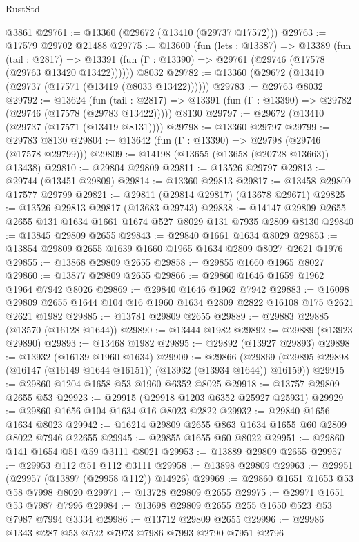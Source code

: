 \begin{lexlean}{RustStd}
\begin{coremodule}
    @3861
@29761 := @13360 (@29672 (@13410 (@29737 @17572)))
@29763 := @17579 @29702 @21488
@29775 := @13600
    (fun (lets : @13387) =>
    @13389
      (fun (tail : @2817) =>
      @13391 (fun (Γ : @13390) => @29761 (@29746 (@17578 (@29763 @13420 @13422))))))
    @8032
@29782 := @13360 (@29672 (@13410 (@29737 (@17571 (@13419 (@8033 @13422))))))
@29783 := @29763 @8032
@29792 := @13624
    (fun (tail : @2817) => @13391 (fun (Γ : @13390) => @29782 (@29746 (@17578 (@29783 @13422)))))
    @8130
@29797 := @29672 (@13410 (@29737 (@17571 (@13419 @8131))))
@29798 := @13360 @29797
@29799 := @29783 @8130
@29804 := @13642 (fun (Γ : @13390) => @29798 (@29746 (@17578 @29799)))
@29809 := @14198 (@13655 (@13658 (@20728 @13663)) @13438)
@29810 := @29804 @29809
@29811 := @13526 @29797
@29813 := @29744 (@13451 @29809)
@29814 := @13360 @29813
@29817 := @13458 @29809 @17577 @29799
@29821 := @29811 (@29814 @29817) (@13678 @29671)
@29825 := @13526 @29813 @29817 (@13683 @29743)
@29838 := @14147 @29809 @2655 @2655 @131 @1634 @1661 @1674 @527 @8029 @131 @7935 @2809 @8130
@29840 := @13845 @29809 @2655
@29843 := @29840 @1661 @1634 @8029
@29853 := @13854 @29809 @2655 @1639 @1660 @1965 @1634 @2809 @8027 @2621 @1976
@29855 := @13868 @29809 @2655
@29858 := @29855 @1660 @1965 @8027
@29860 := @13877 @29809 @2655
@29866 := @29860 @1646 @1659 @1962 @1964 @7942 @8026
@29869 := @29840 @1646 @1962 @7942
@29883 := @16098 @29809 @2655 @1644 @104 @16 @1960 @1634 @2809 @2822 @16108 @175 @2621 @2621 @1982
@29885 := @13781 @29809 @2655
@29889 := @29883 @29885 (@13570 (@16128 @1644))
@29890 := @13444 @1982
@29892 := @29889 (@13923 @29890)
@29893 := @13468 @1982
@29895 := @29892 (@13927 @29893)
@29898 := @13932 (@16139 @1960 @1634)
@29909 := @29866
    (@29869 (@29895 @29898 (@16147 (@16149 @1644 @16151)) (@13932 (@13934 @1644)) @16159))
@29915 := @29860 @1204 @1658 @53 @1960 @6352 @8025
@29918 := @13757 @29809 @2655 @53
@29923 := @29915 (@29918 @1203 @6352 @25927 @25931)
@29929 := @29860 @1656 @104 @1634 @16 @8023 @2822
@29932 := @29840 @1656 @1634 @8023
@29942 := @16214 @29809 @2655 @863 @1634 @1655 @60 @2809 @8022 @7946 @22655
@29945 := @29855 @1655 @60 @8022
@29951 := @29860 @141 @1654 @51 @59 @3111 @8021
@29953 := @13889 @29809 @2655
@29957 := @29953 @112 @51 @112 @3111
@29958 := @13898 @29809
@29963 := @29951 (@29957 (@13897 (@29958 @112)) @14926)
@29969 := @29860 @1651 @1653 @53 @58 @7998 @8020
@29971 := @13728 @29809 @2655
@29975 := @29971 @1651 @53 @7987 @7996
@29984 := @13698 @29809 @2655 @255 @1650 @523 @53 @7987 @7994 @3334
@29986 := @13712 @29809 @2655
@29996 := @29986 @1343 @287 @53 @522 @7973 @7986 @7993 @2790 @7951 @2796

\end{coremodule}
\end{lexlean}
